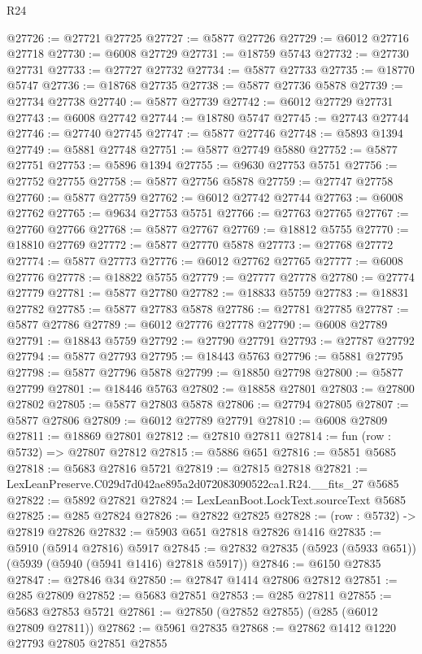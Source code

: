 \begin{lexlean}{R24}
\begin{coremodule}
@27726 := @27721 @27725
@27727 := @5877 @27726
@27729 := @6012 @27716 @27718
@27730 := @6008 @27729
@27731 := @18759 @5743
@27732 := @27730 @27731
@27733 := @27727 @27732
@27734 := @5877 @27733
@27735 := @18770 @5747
@27736 := @18768 @27735
@27738 := @5877 @27736 @5878
@27739 := @27734 @27738
@27740 := @5877 @27739
@27742 := @6012 @27729 @27731
@27743 := @6008 @27742
@27744 := @18780 @5747
@27745 := @27743 @27744
@27746 := @27740 @27745
@27747 := @5877 @27746
@27748 := @5893 @1394
@27749 := @5881 @27748
@27751 := @5877 @27749 @5880
@27752 := @5877 @27751
@27753 := @5896 @1394
@27755 := @9630 @27753 @5751
@27756 := @27752 @27755
@27758 := @5877 @27756 @5878
@27759 := @27747 @27758
@27760 := @5877 @27759
@27762 := @6012 @27742 @27744
@27763 := @6008 @27762
@27765 := @9634 @27753 @5751
@27766 := @27763 @27765
@27767 := @27760 @27766
@27768 := @5877 @27767
@27769 := @18812 @5755
@27770 := @18810 @27769
@27772 := @5877 @27770 @5878
@27773 := @27768 @27772
@27774 := @5877 @27773
@27776 := @6012 @27762 @27765
@27777 := @6008 @27776
@27778 := @18822 @5755
@27779 := @27777 @27778
@27780 := @27774 @27779
@27781 := @5877 @27780
@27782 := @18833 @5759
@27783 := @18831 @27782
@27785 := @5877 @27783 @5878
@27786 := @27781 @27785
@27787 := @5877 @27786
@27789 := @6012 @27776 @27778
@27790 := @6008 @27789
@27791 := @18843 @5759
@27792 := @27790 @27791
@27793 := @27787 @27792
@27794 := @5877 @27793
@27795 := @18443 @5763
@27796 := @5881 @27795
@27798 := @5877 @27796 @5878
@27799 := @18850 @27798
@27800 := @5877 @27799
@27801 := @18446 @5763
@27802 := @18858 @27801
@27803 := @27800 @27802
@27805 := @5877 @27803 @5878
@27806 := @27794 @27805
@27807 := @5877 @27806
@27809 := @6012 @27789 @27791
@27810 := @6008 @27809
@27811 := @18869 @27801
@27812 := @27810 @27811
@27814 := fun (row : @5732) => @27807 @27812
@27815 := @5886 @651
@27816 := @5851 @5685
@27818 := @5683 @27816 @5721
@27819 := @27815 @27818
@27821 := LexLeanPreserve.C029d7d042ae895a2d072083090522ca1.R24.__fits_27 @5685
@27822 := @5892 @27821
@27824 := LexLeanBoot.LockText.sourceText @5685
@27825 := @285 @27824
@27826 := @27822 @27825
@27828 := (row : @5732) -> @27819 @27826
@27832 := @5903 @651 @27818 @27826 @1416
@27835 := @5910 (@5914 @27816) @5917
@27845 := @27832 @27835 (@5923 (@5933 @651)) (@5939 (@5940 (@5941 @1416) @27818 @5917))
@27846 := @6150 @27835
@27847 := @27846 @34
@27850 := @27847 @1414 @27806 @27812
@27851 := @285 @27809
@27852 := @5683 @27851
@27853 := @285 @27811
@27855 := @5683 @27853 @5721
@27861 := @27850 (@27852 @27855) (@285 (@6012 @27809 @27811))
@27862 := @5961 @27835
@27868 := @27862 @1412 @1220 @27793 @27805 @27851 @27855

\end{coremodule}
\end{lexlean}
